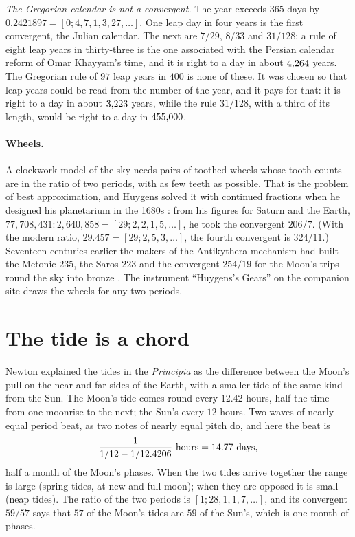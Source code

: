 \emph{The Gregorian calendar is not a convergent.} The year exceeds $365$ days by $0.2421897 = [0; 4, 7, 1, 3, 27, \ldots]$. One leap day in four years is the first convergent, the Julian calendar. The next are $7/29$, $8/33$ and $31/128$; a rule of eight leap years in thirty-three is the one associated with the Persian calendar reform of Omar Khayyam's time, and it is right to a day in about $4{,}264$ years. The Gregorian rule of $97$ leap years in $400$ is none of these. It was chosen so that leap years could be read from the number of the year, and it pays for that: it is right to a day in about $3{,}223$ years, while the rule $31/128$, with a third of its length, would be right to a day in $455{,}000$.

\paragraph{Wheels.} A clockwork model of the sky needs pairs of toothed wheels whose tooth counts are in the ratio of two periods, with as few teeth as possible. That is the problem of best approximation, and Huygens solved it with continued fractions when he designed his planetarium in the 1680s \citep{Huygens1703}: from his figures for Saturn and the Earth, $77{,}708{,}431 : 2{,}640{,}858 = [29; 2, 2, 1, 5, \ldots]$, he took the convergent $206/7$. (With the modern ratio, $29.457 = [29; 2, 5, 3, \ldots]$, the fourth convergent is $324/11$.) Seventeen centuries earlier the makers of the Antikythera mechanism had built the Metonic $235$, the Saros $223$ and the convergent $254/19$ for the Moon's trips round the sky into bronze \citep{Freeth2006}. The instrument ``Huygens's Gears'' on the companion site draws the wheels for any two periods.

\section{The tide is a chord}\label{sec:nw-tides}

Newton explained the tides in the \emph{Principia} as the difference between the Moon's pull on the near and far sides of the Earth, with a smaller tide of the same kind from the Sun. The Moon's tide comes round every $12.42$ hours, half the time from one moonrise to the next; the Sun's every $12$ hours. Two waves of nearly equal period beat, as two notes of nearly equal pitch do, and here the beat is
\[
\frac{1}{1/12 - 1/12.4206} \ \text{hours} = 14.77 \ \text{days},
\]
half a month of the Moon's phases. When the two tides arrive together the range is large (spring tides, at new and full moon); when they are opposed it is small (neap tides). The ratio of the two periods is $[1; 28, 1, 1, 7, \ldots]$, and its convergent $59/57$ says that $57$ of the Moon's tides are $59$ of the Sun's, which is one month of phases.


